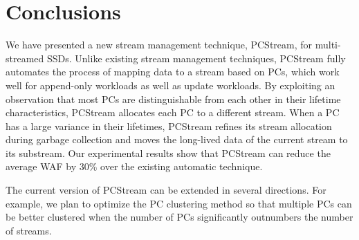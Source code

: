 \vspace{-10pt}
\section{Conclusions}
\vspace{-5pt}
We have presented a new stream management technique, \textsf{\small PCStream}, for multi-streamed SSDs.  
Unlike existing stream management techniques, \textsf{\small PCStream} fully automates 
the process of mapping data to a stream based on PCs, 
which work well for append-only workloads as well as update workloads.  
By exploiting an observation that most PCs are distinguishable from each other 
in their lifetime characteristics, \textsf{\small PCStream} allocates each PC to a different stream.  
When a PC has a large variance in their lifetimes, \textsf{\small PCStream} refines its stream allocation 
during garbage collection and moves the long-lived data of the current stream to its substream.  
Our experimental results show that \textsf{\small PCStream} can reduce the average WAF by 30\% over the existing %
automatic technique.

The current version of \textsf{\small PCStream} can be extended in several directions.  
For example, we plan to optimize the PC clustering method so that
multiple PCs can be better clustered when the number of PCs significantly
outnumbers the number of streams.  

